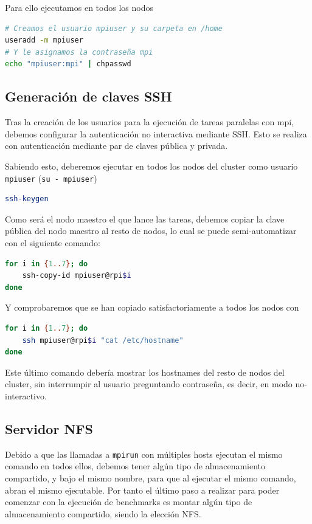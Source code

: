 Para ello ejecutamos en todos los nodos
\begin{lstlisting}[language=bash]
# Creamos el usuario mpiuser y su carpeta en /home
useradd -m mpiuser
# Y le asignamos la contraseña mpi
echo "mpiuser:mpi" | chpasswd
\end{lstlisting}

\subsection{Generación de claves SSH}
Tras la creación de los usuarios para la ejecución de tareas paralelas con mpi, debemos configurar la autenticación no interactiva mediante SSH. Esto se realiza con autenticación mediante par de claves pública y privada.

Sabiendo esto, deberemos ejecutar en todos los nodos del cluster como usuario \texttt{mpiuser} (\texttt{su - mpiuser})
\begin{lstlisting}[language=bash]
ssh-keygen
\end{lstlisting}

Como será el nodo maestro el que lance las tareas, debemos copiar la clave pública del nodo maestro al resto de nodos, lo cual se puede semi-automatizar con el siguiente comando:

\begin{lstlisting}[language=bash]
for i in {1..7}; do
    ssh-copy-id mpiuser@rpi$i
done
\end{lstlisting}

Y comprobaremos que se han copiado satisfactoriamente a todos los nodos con
\begin{lstlisting}[language=bash]
for i in {1..7}; do
    ssh mpiuser@rpi$i "cat /etc/hostname"
done
\end{lstlisting}
Este último comando debería mostrar los hostnames del resto de nodos del cluster, sin interrumpir al usuario preguntando contraseña, es decir, en modo no-interactivo.


\subsection{Servidor NFS}
Debido a que las llamadas a \texttt{mpirun} con múltiples hosts ejecutan el mismo comando en todos ellos, debemos tener algún tipo de almacenamiento compartido, y bajo el mismo nombre, para que al ejecutar el mismo comando, abran el mismo ejecutable. Por tanto el último paso a realizar para poder comenzar con la ejecución de benchmarks es montar algún tipo de almacenamiento compartido, siendo la elección NFS.

